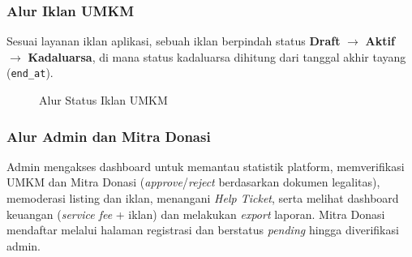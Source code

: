 \subsubsection{Alur Iklan UMKM}
Sesuai layanan iklan aplikasi, sebuah iklan berpindah status \textbf{Draft} $\rightarrow$
\textbf{Aktif} $\rightarrow$ \textbf{Kadaluarsa}, di mana status kadaluarsa dihitung dari tanggal
akhir tayang (\texttt{end\_at}).

\begin{figure}[htbp]
\centering
{}
\caption{Alur Status Iklan UMKM}
\label{fig:alur_iklan}
\end{figure}

\subsubsection{Alur Admin dan Mitra Donasi}
Admin mengakses dashboard untuk memantau statistik platform, memverifikasi UMKM dan Mitra Donasi
(\textit{approve}/\textit{reject} berdasarkan dokumen legalitas), memoderasi listing dan iklan,
menangani \textit{Help Ticket}, serta melihat dashboard keuangan (\textit{service fee} + iklan) dan
melakukan \textit{export} laporan. Mitra Donasi mendaftar melalui halaman registrasi dan berstatus
\emph{pending} hingga diverifikasi admin.
